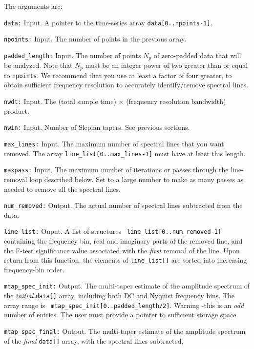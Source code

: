 The arguments are: 
\begin{description}
\item{\tt  data:} Input.  A pointer to the time-series array {\tt data[0..npoints-1]}.
\item{\tt  npoints:} Input.  The number of points in the previous array.
\item{\tt  padded\_length:} Input.  The number of points $N_p$ of 
  zero-padded data that will be analyzed.  
  Note that $N_p$ must be an integer power of two
  greater than or equal to {\tt npoints}.  We recommend that you use
  at least a factor of four greater, to obtain sufficient frequency
  resolution to accurately identify/remove spectral lines.
\item{\tt nwdt:} Input.  The (total sample time) $\times$ (frequency
  resolution bandwidth) product.
\item{\tt  nwin:}  Input.  Number of Slepian tapers.  See previous sections.
\item{\tt  max\_lines:}  Input.  The maximum number of spectral lines that you
  want removed.  The array {\tt line\_list[0..max\_lines-1]} must have at
  least this length.
\item{\tt maxpass:} Input.  The maximum number of iterations or passes
through the line-removal loop described below.  Set to a large number to
make as many passes as needed to remove all the spectral lines.
\item{\tt  num\_removed:}  Output.  The actual number of spectral lines
  subtracted from the data.
\item{\tt  line\_list:}  Ouput.  A list of structures {\tt
  line\_list[0..num\_removed-1]} containing the frequency bin, real and
  imaginary parts of the removed line, and the F-test significance value
  associated with the {\it first} removal of the line.  Upon return from
  this function, the elements of {\tt line\_list[]} are sorted into
  increasing frequency-bin order.
\item{\tt  mtap\_spec\_init:}  Output.  The multi-taper estimate of the
  amplitude spectrum of
  the {\it initial} {\tt data[]} array, including both
  DC and Nyquist frequency bins.  The array range is {\tt
  mtap\_spec\_init[0..padded\_length/2]}. Warning -this is an {\it odd}
  number of entries.  The user must provide a pointer to sufficient
  storage space.
\item{\tt  mtap\_spec\_final:}  Output.  The multi-taper estimate of the
  amplitude spectrum of
  the {\it final} {\tt data[]} array, with the spectral lines subtracted,

\end{description}
